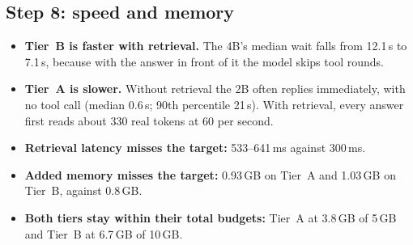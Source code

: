 \documentclass[11pt,a4paper]{article}
\begin{document}
\subsection{Step 8: speed and memory}
\begin{table}[H]
\centering
\small
{}
\caption{Speed and memory. Tier~B figures come from the full Vulkan quality runs; Tier~A from the 40-question CPU run.
``First word'' is the wait before the answer starts: retrieval, every tool round and the final prompt reading. Peak RAM
is the model server plus the assistant's process.}
\label{tab:speed}
\end{table}

\begin{itemize}
  \item \textbf{Tier~B is faster with retrieval.} The 4B's median wait falls from 12.1\,s to 7.1\,s, because with the
        answer in front of it the model skips tool rounds.
  \item \textbf{Tier~A is slower.} Without retrieval the 2B often replies immediately, with no tool call (median 0.6\,s;
        90th percentile 21\,s). With retrieval, every answer first reads about 330 real tokens at 60 per second.
  \item \textbf{Retrieval latency misses the target:} 533--641\,ms against 300\,ms.
  \item \textbf{Added memory misses the target:} 0.93\,GB on Tier~A and 1.03\,GB on Tier~B, against 0.8\,GB.
  \item \textbf{Both tiers stay within their total budgets:} Tier~A at 3.8\,GB of 5\,GB and Tier~B at 6.7\,GB of 10\,GB.
\end{itemize}
\end{document}
